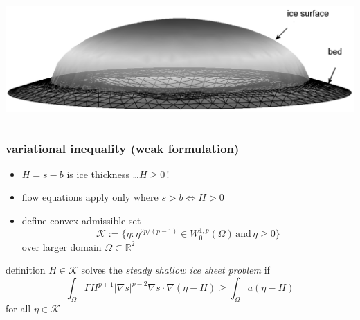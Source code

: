 \documentclass[hide notes,intlimits]{beamer}
\newcommand{\RR}{\mathbb{R}}
\newcommand{\Kcal}{\mathcal{K}}
\newcommand{\grad}{\nabla}
\begin{document}
\begin{frame}
\begin{columns}
\begin{column}{0.55\textwidth}
\begin{center}
\vspace{10mm}
\includegraphics[width=1.05\textwidth]{capnonflatobs}
\end{center}
\end{column}
\end{columns}
\end{frame}


\begin{frame}
  \frametitle{variational inequality (weak formulation)} 
\begin{itemize}
\item $H=s-b$ is ice thickness \dots $H\ge 0$\,!
\item flow equations apply only where $s>b \iff H > 0$
\item define convex admissible set
  $$\Kcal := \{\eta : \eta^{2p/(p-1)} \in W^{1,p}_0 (\Omega) \,\text{and}\, \eta \ge 0\}$$
over larger domain $\Omega \subset \RR^2$
\end{itemize}
\begin{block}{definition} 
$H \in \Kcal$ solves the \emph{steady shallow ice sheet problem} if
  $$\int_{\Omega}  \Gamma H^{p+1} |\grad s|^{p-2} \grad s \cdot \grad(\eta - H)  
\ge \int_{\Omega} a (\eta - H)$$
for all $\eta \in \Kcal$
\end{block}
\end{frame}
\end{document}
